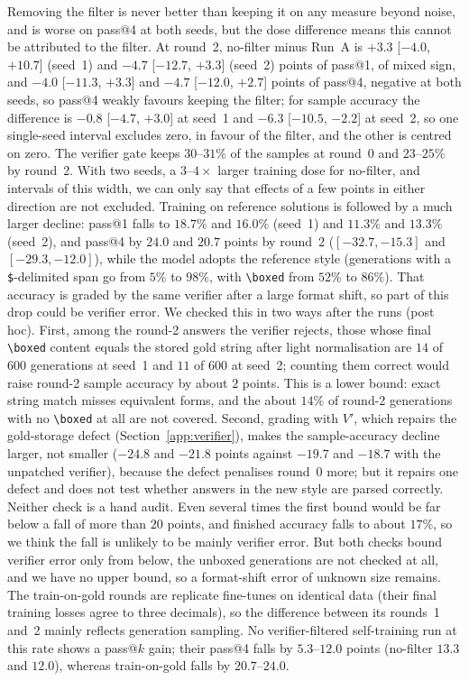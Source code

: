 \documentclass[runningheads]{llncs}
\begin{document}
Removing the filter is never better than keeping it on any measure beyond
noise, and is worse on pass@4 at both seeds, but the dose difference means
this cannot be attributed to the filter. At round~2,
no-filter minus Run~A is $+3.3$ [$-4.0$, $+10.7$] (seed~1) and $-4.7$ [$-12.7$, $+3.3$] (seed~2) points
of pass@1, of mixed sign, and $-4.0$ [$-11.3$, $+3.3$] and $-4.7$ [$-12.0$, $+2.7$] points of pass@4,
negative at both seeds, so pass@4 weakly favours keeping the filter; for sample
accuracy the difference is $-0.8$ [$-4.7$, $+3.0$] at seed~1 and $-6.3$
[$-10.5$, $-2.2$] at seed~2, so one single-seed interval excludes zero, in
favour of the filter, and the other is centred on zero. The verifier
gate keeps $30$--$31\%$ of the samples at round~0 and $23$--$25\%$ by round~2. With two
seeds, a $3$--$4\times$ larger training dose for no-filter, and intervals of this
width, we can only say that effects of a few points in either direction are not
excluded. Training on reference solutions is followed by a much larger decline:
pass@1 falls to $18.7\%$ and $16.0\%$ (seed~1) and $11.3\%$ and $13.3\%$ (seed~2),
and pass@4 by $24.0$ and $20.7$ points by round~2 ($[-32.7,-15.3]$ and $[-29.3,-12.0]$), while
the model adopts the reference style (generations with a \texttt{\$}-delimited
span go from $5\%$ to $98\%$, with \verb|\boxed| from $52\%$ to $86\%$). That
accuracy is graded by the same verifier after a large format shift, so part of
this drop could be verifier error. We checked this in two ways after the runs
(post hoc). First, among the round-2 answers the verifier rejects, those whose
final \verb|\boxed| content equals the stored gold string after light
normalisation are $14$ of $600$ generations at seed~1 and $11$ of $600$ at
seed~2; counting them correct would raise round-2 sample accuracy by about $2$
points. This is a lower bound: exact string match misses equivalent forms, and
the about $14\%$ of round-2 generations with no \verb|\boxed| at all are not
covered. Second, grading with $V'$, which repairs the gold-storage defect (Section~\ref{app:verifier}), makes
the sample-accuracy decline larger, not smaller ($-24.8$ and $-21.8$ points
against $-19.7$ and $-18.7$ with the unpatched verifier), because the defect penalises round~0 more; but it
repairs one defect and does not test whether answers in the new style are
parsed correctly. Neither check is a hand audit. Even several times the first
bound would be far below a fall of more than $20$ points, and finished accuracy
falls to about $17\%$, so we think the fall is unlikely to be mainly verifier
error. But both checks bound verifier error only from below, the unboxed
generations are not checked at all, and we have no upper bound, so a
format-shift error of unknown size remains.
The train-on-gold rounds are replicate fine-tunes on
identical data (their final training losses agree to three decimals), so the
difference between its rounds~1 and~2 mainly reflects generation sampling. No
verifier-filtered self-training run at this rate shows a pass@$k$ gain; their
pass@4 falls by $5.3$--$12.0$ points (no-filter $13.3$ and $12.0$), whereas
train-on-gold falls by $20.7$--$24.0$.
\end{document}
